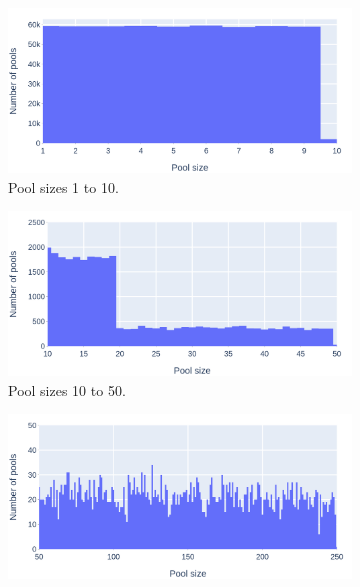 \begin{figure} 
  \begin{subfigure}[b]{0.5\linewidth}
    \centering
    \includegraphics[width=\linewidth]{3 - Stride/fig/workplace_1-10_poolsizes.png} 
    \caption{Pool sizes 1 to 10.} 
    \label{fig:workplace_1-10_poolsizes} 
    \vspace{4ex}
  \end{subfigure}%
  \begin{subfigure}[b]{0.5\linewidth}
    \centering
    \includegraphics[width=\linewidth]{3 - Stride/fig/workplace_10-50_poolsizes.png} 
    \caption{Pool sizes 10 to 50.} 
    \label{fig:workplace_10-50_poolsizes} 
    \vspace{4ex}
  \end{subfigure} 
  \begin{subfigure}[b]{0.5\linewidth}
    \centering
    \includegraphics[width=\linewidth]{3 - Stride/fig/workplace_50-250_poolsizes.png} 

\end{subfigure}
\end{figure}
